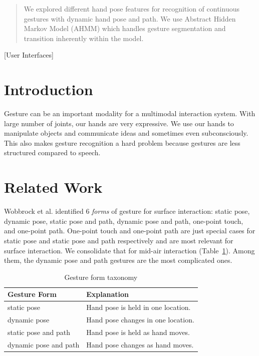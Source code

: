 \documentclass{sig-alternate}
\begin{document}
\maketitle
\begin{abstract}
We explored different hand pose features for recognition of continuous gestures
with dynamic hand pose and path. We use Abstract Hidden Markov Model (AHMM)
which handles gesture segmentation and transition inherently within the model.
\end{abstract}

[User Interfaces]


\section{Introduction}
Gesture can be an important modality for a multimodal interaction system.
With large number of joints, our hands are very expressive. We use our hands to
manipulate objects and communicate ideas and sometimes even subconsciously. This
also makes gesture recognition a hard problem because gestures are less
structured compared to speech.

\section{Related Work}
Wobbrock et al. \cite{Wobbrock09} identified 6 \textit{forms} of gesture for surface
interaction: static pose, dynamic pose,
static pose and path, dynamic pose and path, one-point touch, and one-point
path. One-point touch and one-point path are just special cases for static pose
and static pose and path respectively and are most relevant for surface
interaction. We consolidate that for mid-air interaction
(Table~\ref{tab:gesture-form}).
Among them, the dynamic pose and path gestures are the most complicated ones. 

\begin{table}
\centering
\caption{Gesture form taxonomy}
\begin{tabular}{|l|l|} \hline
\textbf{Gesture Form}&\textbf{Explanation}\\ \hline
static pose & Hand pose is held in one location. \\ \hline
dynamic pose & Hand pose changes in one location. \\ \hline
static pose and path & Hand pose is held as hand moves. \\ \hline
dynamic pose and path & Hand pose changes as hand moves. \\
\hline\end{tabular}
\label{tab:gesture-form}
\end{table}
\end{document}
